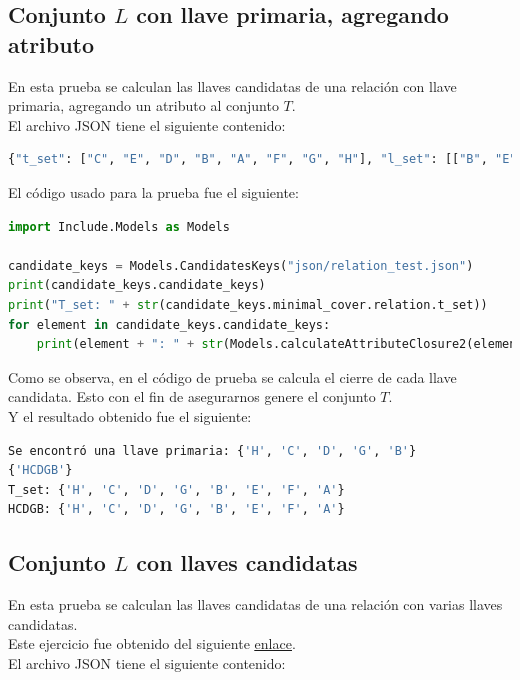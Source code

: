 \documentclass[a4paper,12pt]{article}
\begin{document}
{\subsection{Conjunto $L$ con llave primaria, agregando atributo}
En esta prueba se calculan las llaves candidatas de una relación con llave primaria, agregando un atributo al conjunto $T$.
\\
El archivo JSON tiene el siguiente contenido:

\begin{lstlisting}[language=python, caption={Archivo JSON con llave primaria, agregando un atributo.\\\hspace{\textwidth}}, captionpos=t]
{"t_set": ["C", "E", "D", "B", "A", "F", "G", "H"], "l_set": [["B", "E"], ["D", "E"], ["G", "F"], ["A", "E"], ["G", "E"], ["B", "F"], ["F", "A"]]}
\end{lstlisting}

El código usado para la prueba fue el siguiente:

\begin{lstlisting}[language=python, caption={Prueba con una relación con llave primaria.\\\hspace{\textwidth}}, captionpos=t]
import Include.Models as Models

candidate_keys = Models.CandidatesKeys("json/relation_test.json")
print(candidate_keys.candidate_keys)
print("T_set: " + str(candidate_keys.minimal_cover.relation.t_set))
for element in candidate_keys.candidate_keys:
    print(element + ": " + str(Models.calculateAttributeClosure2(element,candidate_keys.minimal_cover.irreducible_rel.l_set)))

\end{lstlisting}
Como se observa, en el código de prueba se calcula el cierre de cada llave candidata. Esto con el fin de asegurarnos genere el conjunto $T$.
\\
Y el resultado obtenido fue el siguiente:

\begin{lstlisting}[language=bash, caption={Resultado de llaves candidatas.\\\hspace{\textwidth}}, captionpos=t]
Se encontró una llave primaria: {'H', 'C', 'D', 'G', 'B'}
{'HCDGB'}
T_set: {'H', 'C', 'D', 'G', 'B', 'E', 'F', 'A'}
HCDGB: {'H', 'C', 'D', 'G', 'B', 'E', 'F', 'A'}
\end{lstlisting}

\subsection{Conjunto $L$ con llaves candidatas}
En esta prueba se calculan las llaves candidatas de una relación con varias llaves candidatas.
\\
Este ejercicio fue obtenido del siguiente \href{https://djitz.com/neu-mscs/how-to-find-candidate-keys/}{\underline{enlace}}.
\\
El archivo JSON tiene el siguiente contenido:

}
\end{document}
